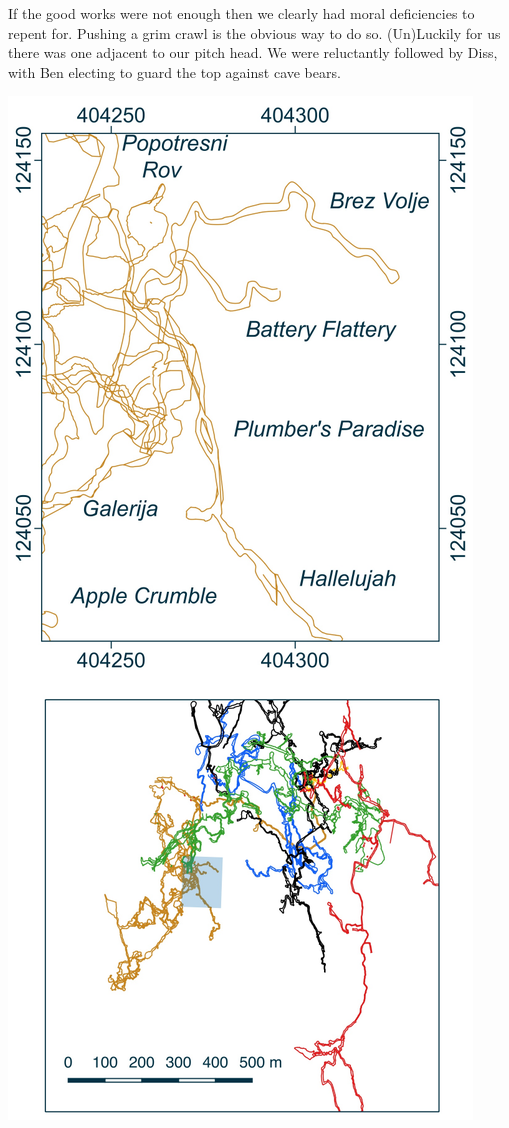 If the good works were not enough then we clearly had moral deficiencies to repent for. Pushing a grim crawl is the obvious way to do so. (Un)Luckily for us there was one adjacent to our pitch head.  We were reluctantly followed by Diss, with Ben electing to guard the top against cave bears.

\begin{marginfigure}
\checkoddpage \ifoddpage \forcerectofloat \else \forceversofloat \fi
\centering
 \includegraphics[width=\linewidth]{images/little_insets/hallelujah_inset.pdf}

\end{marginfigure}
